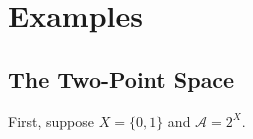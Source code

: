 \documentclass{article}
\begin{document}
%



\newpage%
\section{Examples}

\subsection{The Two-Point Space}
First, suppose $X = \{0,1\}$ and $\mathcal A = 2^X$.
\end{document}
